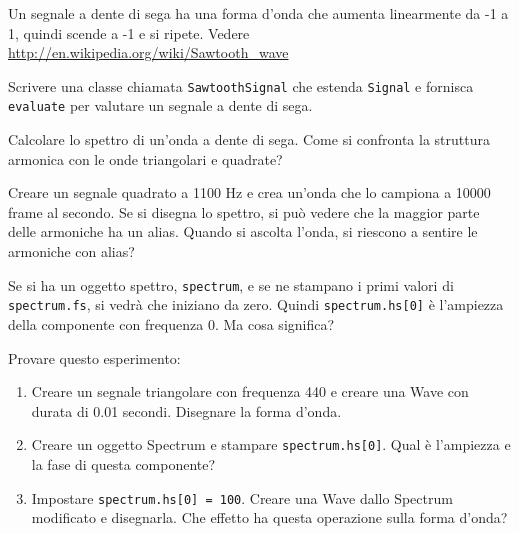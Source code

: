 \documentclass[12pt,a4paper]{book}
\begin{document}
\begin{exercise} Un segnale a dente di sega ha una forma d'onda che aumenta linearmente da -1 a 1, quindi scende a -1 e si ripete. Vedere \url{http://en.wikipedia.org/wiki/Sawtooth_wave}

Scrivere una classe chiamata {\tt SawtoothSignal} che estenda {\tt Signal} e fornisca {\tt evaluate} per valutare un segnale a dente di sega.

Calcolare lo spettro di un'onda a dente di sega. Come si confronta la struttura armonica con le onde triangolari e quadrate? \end{exercise} 

\begin{exercise} Creare un segnale quadrato a 1100 Hz e crea un'onda che lo campiona a 10000 frame al secondo. Se si disegna lo spettro, si può vedere che la maggior parte delle armoniche ha un alias. Quando si ascolta l'onda, si riescono a sentire le armoniche con alias? \end{exercise} 

\begin{exercise} Se si ha un oggetto spettro, {\tt spectrum}, e se ne stampano i primi valori di {\tt spectrum.fs}, si vedrà che iniziano da zero. Quindi {\tt spectrum.hs[0]} è l'ampiezza della componente con frequenza 0. Ma cosa significa?

Provare questo esperimento:

\begin{enumerate} 

\item Creare un segnale triangolare con frequenza 440 e creare una Wave con durata di 0.01 secondi. Disegnare la forma d'onda.

\item Creare un oggetto Spectrum e stampare {\tt spectrum.hs[0]}. Qual è l'ampiezza e la fase di questa componente?

\item Impostare {\tt spectrum.hs[0] = 100}. Creare una Wave dallo Spectrum modificato e disegnarla. Che effetto ha questa operazione sulla forma d'onda?

\end{enumerate} 

\end{exercise} 
\end{document}
